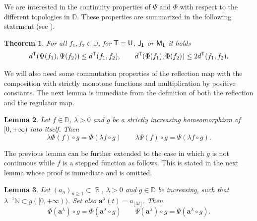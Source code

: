 \documentclass[]{amsart}
\numberwithin{equation}{section}
\newtheorem{thm}{Theorem}[section]
\newtheorem{lem}[thm]{Lemma}
\theoremstyle{remark}
\theoremstyle{definition}
\DeclareMathOperator{\R}{\mathbb{R}}
\begin{document}
We are interested in the continuity properties of $\Psi$ and $\Phi$ with respect to the different topologies in $\mathbb{D}$. These properties are summarized in the following statement (see \cite[Lemmas 13.4.1, 13.5.1 and Theorems 13.4.1, 13.5.1]{whitt2002stochastic}).
\begin{thm}\label{thm:continuity}
	For all $f_1,f_2 \in \mathbb{D}$, for ${\sf T}={\sf U}$, ${\sf J_1}$ or ${\sf M_1}$ it holds
	\begin{equation*}
		d^{{\sf T}}(\Psi(f_1),\Psi(f_2)) \le d^{\sf T}(f_1,f_2), \qquad  d^{\sf T}(\Phi(f_1),\Phi(f_2)) \le 2d^{\sf T}(f_1,f_2).
	\end{equation*}
\end{thm}
We will also need some commutation properties of the reflection map with the composition with strictly monotone functions and multiplication by positive constants. The next lemma is immediate from the definition of both the reflection and the regulator map.
\begin{lem}\label{lem:scaling}
	Let $f \in \mathbb{D}$, $\lambda>0$ and $g$ be a strictly increasing homeomorphism of $[0,+\infty)$ into itself. Then
	\begin{equation*}
		\lambda\Phi(f)\circ g=\Phi(\lambda f \circ g) \qquad \lambda \Psi(f)\circ g=\Psi(\lambda f \circ g).
	\end{equation*}
\end{lem}
The previous lemma can be further extended to the case in which $g$ is not continuous while $f$ is a stepped function as follows. This is stated in the next lemma whose proof is immediate and is omitted.
\begin{lem}\label{lem:scaling2}
	Let $(a_n)_{n \ge 1} \subset \R$, $\lambda>0$ and $g \in \mathbb{D}$ be increasing, such that $\lambda^{-1}\mathbb{N} \subset g([0,+\infty))$. Set also $\mathbf{a}^\lambda(t)=a_{\lfloor \lambda t \rfloor}$. Then
	\begin{equation*}
		\Phi(\mathbf{a}^\lambda)\circ g=\Phi(\mathbf{a}^{\lambda} \circ g) \qquad \Psi(\mathbf{a}^\lambda)\circ g=\Psi(\mathbf{a}^\lambda \circ g).
	\end{equation*}
\end{lem}
\end{document}
